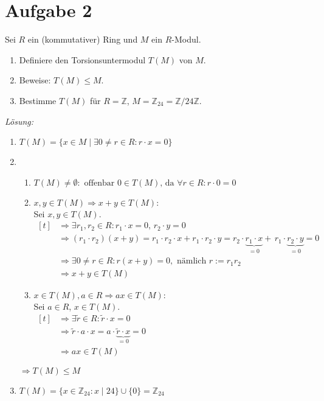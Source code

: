 \documentclass[]{scrartcl}
\newcommand{\Z}{\mathbb{Z}}
\newcommand{\<}{\trianglelefteq}
\begin{document}
\section*{Aufgabe 2}
Sei $R$ ein (kommutativer) Ring und $M$ ein $R$-Modul.
\begin{enumerate}[label=(\alph*)]
	\item Definiere den Torsionsuntermodul $T(M)$ von $M$.
	\item Beweise: $T(M) \leq M$.
	\item Bestimme $T(M)$ für $R = \Z$, $M=\Z_{24}=\Z/24\Z$.
\end{enumerate}
\textit{Lösung:}
\begin{enumerate}[label=zu (\alph*):]
	\item $T(M)=\{x \in M \mid \exists 0 \ne r \in R \colon r\cdot x=0\}$
	\item
		\begin{enumerate}[label=(\roman*)]
			\item $T(M)\ne \emptyset : \text{ offenbar } 0 \in T(M) \text{, da } \forall r\in R\colon r\cdot 0 =0$
			\item $x,y\in T(M) \Rightarrow x+y\in T(M):$\\
				Sei $x,y\in T(M).$\\
				$\begin{aligned}[t]
					&\Rightarrow \exists r_1,r_2\in R\colon r_1\cdot x=0,\, r_2\cdot y=0 \\
					&\Rightarrow (r_1\cdot r_2)(x+y)=r_1\cdot r_2\cdot x+r_1\cdot r_2\cdot y=r_2\cdot \underbrace{r_1\cdot x}_{=0} +\, r_1\cdot \underbrace{r_2\cdot y}_{=0}=0 \\
					&\Rightarrow \exists 0\ne r\in R: r(x+y)=0, \text{ nämlich } r:=r_1r_2 \\
					&\Rightarrow x+y\in T(M)
				\end{aligned}$
			\item $x\in T(M), a \in R \Rightarrow ax \in T(M):$\\
				Sei $a\in R$, $x\in T(M)$.\\
				$\begin{aligned}[t]
					&\Rightarrow \exists \tilde{r}\in R\colon \tilde{r}\cdot x=0 \\
					&\Rightarrow \tilde{r}\cdot a\cdot x=a\cdot \underbrace{\tilde{r}\cdot x}_{=0}=0 \\
					&\Rightarrow ax\in T(M)
				\end{aligned}$
		\end{enumerate}
	$\Rightarrow T(M) \leq M$
	\item $T(M)=\{x\in \Z_{24}\colon x\mid 24\}\cup\{0\}=\Z_{24}$
\end{enumerate}
\pagebreak
\end{document}
